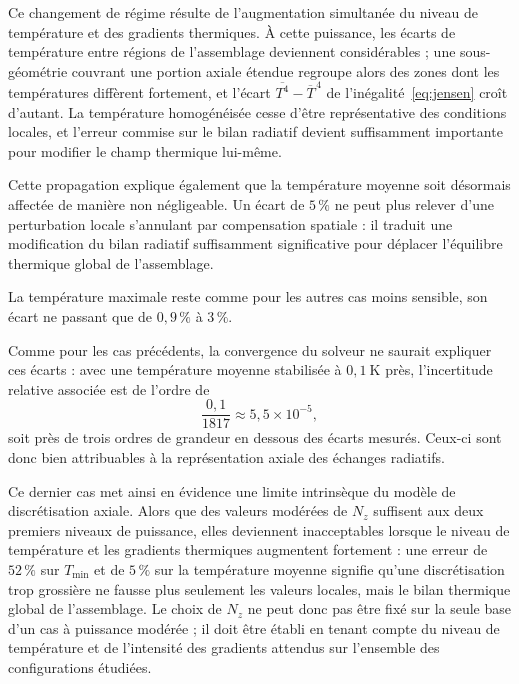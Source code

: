 Ce changement de régime résulte de l'augmentation simultanée du niveau de température et des gradients thermiques. À cette puissance, les écarts de température entre régions de l'assemblage deviennent considérables ; une sous-géométrie couvrant une portion axiale étendue regroupe alors des zones dont les températures diffèrent fortement, et l'écart $\overline{T^4}-\overline{T}^{\,4}$ de l'inégalité~\eqref{eq:jensen} croît d'autant. La température homogénéisée cesse d'être représentative des conditions locales, et l'erreur commise sur le bilan radiatif devient suffisamment importante pour modifier le champ thermique lui-même.

Cette propagation explique également que la température moyenne soit désormais affectée de manière non négligeable. Un écart de $5\,\%$ ne peut plus relever d'une perturbation locale s'annulant par compensation spatiale : il traduit une modification du bilan radiatif suffisamment significative pour déplacer l'équilibre thermique global de l'assemblage.

La température maximale reste comme pour les autres cas moins sensible, son écart ne passant que de $0{,}9\,\%$ à $3\,\%$.

Comme pour les cas précédents, la convergence du solveur ne saurait expliquer ces écarts : avec une température moyenne stabilisée à $0{,}1~\mathrm{K}$ près, l'incertitude relative associée est de l'ordre de
\begin{equation}
\frac{0{,}1}{1817}
\approx 5{,}5\times10^{-5},
\end{equation}
soit près de trois ordres de grandeur en dessous des écarts mesurés. Ceux-ci sont donc bien attribuables à la représentation axiale des échanges radiatifs.

Ce dernier cas met ainsi en évidence une limite intrinsèque du modèle de discrétisation axiale. Alors que des valeurs modérées de $N_z$ suffisent aux deux premiers niveaux de puissance, elles deviennent inacceptables lorsque le niveau de température et les gradients thermiques augmentent fortement : une erreur de $52\,\%$ sur $T_{\min}$ et de $5\,\%$ sur la température moyenne signifie qu'une discrétisation trop grossière ne fausse plus seulement les valeurs locales, mais le bilan thermique global de l'assemblage. Le choix de $N_z$ ne peut donc pas être fixé sur la seule base d'un cas à puissance modérée ; il doit être établi en tenant compte du niveau de température et de l'intensité des gradients attendus sur l'ensemble des configurations étudiées.

